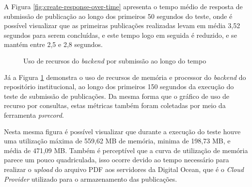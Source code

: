 A Figura \ref{fig:create-response-over-time} apresenta o tempo médio de resposta
de submissão de publicação ao longo dos primeiros 50 segundos do teste, onde é
possível visualizar que as primeiras publicações realizadas levam em média
3,52 segundos para serem concluídas, e este tempo logo em seguida é reduzido, e se
mantém entre 2,5 e 2,8 segundos.

\begin{figure}[H]
    \caption{Uso de recursos do \emph{backend} por submissão ao longo do tempo}
    \centering
    \label{fig:resource-usage-create-research}
\end{figure}

Já a Figura \ref{fig:resource-usage-create-research} demonstra o uso de recursos
de memória e processor do \emph{backend} do repositório institucional, ao longo
dos primeiros 150 segundos da execução do teste de submissão de publicações.
Da mesma forma que o gráfico de uso de recurso por consultas, estas métricas
também foram coletadas por meio da ferramenta \emph{psrecord}.

Nesta mesma figura é possível visualizar que durante a execução do teste houve uma
utilização máxima de 559,62 MB de memória, minima de 198,73 MB, e média de 471,09 MB.
Também é perceptível que a curva de utilização de memória parece um pouco quadriculada,
isso ocorre devido ao tempo necessário para realizar o \emph{upload} do arquivo PDF
aos servidores da Digital Ocean, que é o \emph{Cloud Provider} utilizado para o
armazenamento das publicações.

